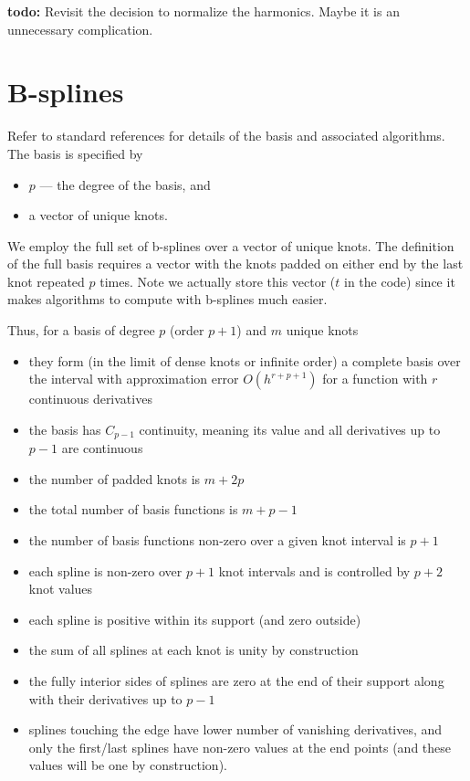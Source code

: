 \documentclass[12pt]{article}
\begin{document}
{\bf todo:} Revisit the decision to normalize the harmonics.  Maybe it is an unnecessary complication.

\section{B-splines}

Refer to standard references for details of the basis and associated algorithms.  The basis is specified by 
\begin{itemize}
\item $p$ --- the degree of the basis, and
\item a vector of unique knots.
\end{itemize}
We employ the full set of b-splines over a vector of unique knots.  The definition of the full basis requires a vector with the knots padded on either end by the last knot repeated $p$ times.  Note we actually store this vector ($t$ in the code) since it makes algorithms to compute with b-splines much easier. 

Thus, for a basis of degree $p$ (order $p+1$) and $m$ unique knots 
\begin{itemize}
\item they form (in the limit of dense knots or infinite order) a complete basis over the interval with approximation error $O\left(h^{r+p+1}\right)$ for a function with $r$ continuous derivatives 
\item the basis has $C_{p-1}$ continuity, meaning its value and all derivatives up to $p-1$ are continuous
\item the number of padded knots is $m + 2p$
\item the total number of basis functions is $m + p - 1$ 
\item the number of basis functions non-zero over a given knot interval is $p + 1$
\item each spline is non-zero over $p+1$ knot intervals and is controlled by $p+2$ knot values
\item each spline is positive within its support (and zero outside)
\item the sum of all splines at each knot is unity by construction
\item the fully interior sides of splines are zero at the end of their support along with their derivatives up to $p-1$
\item splines touching the edge have lower number of vanishing derivatives, and only the first/last splines have non-zero values at the end points (and these values will be one by construction).
\end{itemize}
\end{document}
